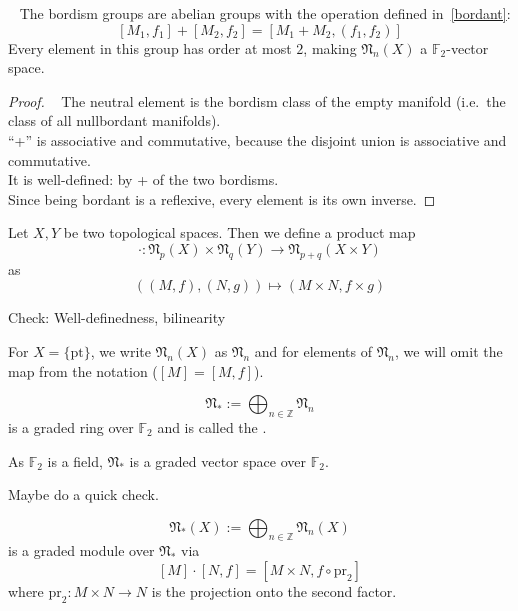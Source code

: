 \documentclass[a4paper,11pt]{article}
\begin{document}
\begin{theorem}\ \cite[II, Satz 2.1]{brocker}
    The bordism groups are abelian groups with the operation defined in\ \ref{bordant}:
    \[[M_1,f_1]+[M_2,f_2]=[M_1+M_2,(f_1,f_2)]\]
    Every element in this group has order at most \(2\), making \(\mathfrak{N}_n(X)\) a \(\mathbb{F}_2\)-vector space.
\end{theorem}

\begin{proof}
    \ \cite{brocker}
    The neutral element is the bordism class of the empty manifold (i.e.\ the class of all nullbordant manifolds).\\
    \enquote{+} is associative and commutative, because the disjoint union is associative and commutative.\\
    It is well-defined: by + of the two bordisms.\\
    Since being bordant is a reflexive, every element is its own inverse.
\end{proof}

Let \(X,Y\) be two topological spaces. Then we define a product map
\[\cdot:\mathfrak{N}_p(X)\times\mathfrak{N}_q(Y)\to\mathfrak{N}_{p+q}(X\times Y)\]
as
\[((M,f),(N,g))\mapsto (M\times N,f\times g)\]

\begin{remark}
    Check: Well-definedness, bilinearity
\end{remark}

For \(X=\{\mathrm{pt}\}\), we write \(\mathfrak{N}_n(X)\) as \(\mathfrak{N}_n\) and for elements of \(\mathfrak{N}_n\), we will omit the map from the notation (\([M]=[M,f]\)).

\begin{definition}
    \[\mathfrak{N}_\ast:=\bigoplus_{n\in\mathbb{Z}}\mathfrak{N}_n\]
    is a graded ring over \(\mathbb{F}_2\) and is called the .
\end{definition}

\begin{remark}
    As \(\mathbb{F}_2\) is a field, \(\mathfrak{N}_\ast\) is a graded vector space over \(\mathbb{F}_2\).
\end{remark}

Maybe do a quick check.

\begin{definition}
    \[\mathfrak{N}_\ast(X):=\bigoplus_{n\in\mathbb{Z}}\mathfrak{N}_n(X)\]
    is a graded module over \(\mathfrak{N}_\ast\) via
    \[[M]\cdot[N,f]=[M\times N, f\circ \mathrm{pr}_2]\]
    where \(\mathrm{pr}_2:M\times N\to N\) is the projection onto the second factor.
\end{definition}
\end{document}
